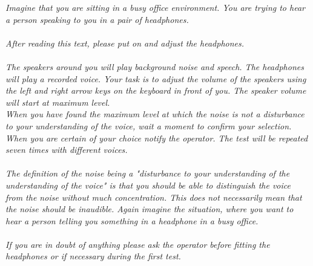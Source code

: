 \textit{Imagine that you are sitting in a busy office environment. You are trying to hear a person speaking to you in a pair of headphones. \\\\
After reading this text, please put on and adjust the headphones.\\\\
The speakers around you will play background noise and speech. The headphones will play a recorded voice. Your task is to adjust the volume of the speakers using the left and right arrow keys on the keyboard in front of you. The speaker volume will start at maximum level. \\
When you have found the maximum level at which the noise is not a disturbance to your understanding of the voice, wait a moment to confirm your selection. When you are certain of your choice notify the operator. 
The test will be repeated seven times with different voices. \\\\
The definition of the noise being a "disturbance to your understanding of the understanding of the voice" is that you should be able to distinguish the voice from the noise without much concentration. This does not necessarily mean that the noise should be inaudible. Again imagine the situation, where you want to hear a person telling you something in a headphone in a busy office.\\\\ 
If you are in doubt of anything please ask the operator before fitting the headphones or if necessary during the first test.}


